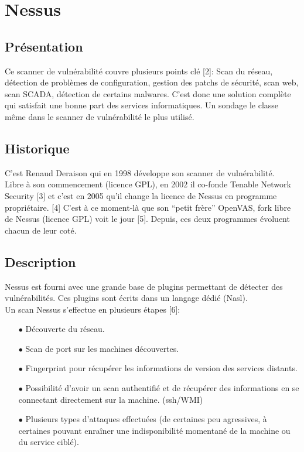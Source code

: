 \section{Nessus}
\thispagestyle{plain}
\subsection{Présentation}
Ce scanner de vulnérabilité couvre plusieurs points clé [2]: Scan du réseau, détection de problèmes de configuration, gestion des patchs de sécurité, scan web, scan SCADA, détection de certains malwares. C’est donc une solution complète qui satisfait une bonne part des services informatiques. Un sondage le classe même dans le scanner de vulnérabilité le plus utilisé.

\subsection{Historique}
C’est Renaud Deraison qui en 1998 développe son scanner de vulnérabilité.\\
Libre à son commencement (licence GPL), en 2002 il co-fonde Tenable Network Security [3] et c’est en 2005 qu’il change la licence de Nessus en programme propriétaire. [4] C’est à ce moment-là que son ``petit frère'' OpenVAS, fork libre de Nessus (licence GPL) voit le jour [5]. Depuis, ces deux programmes évoluent chacun de leur coté.

\subsection{Description}
Nessus est fourni avec une grande base de plugins permettant de détecter des vulnérabilités. Ces plugins sont écrits dans un langage dédié (Nasl).\\
Un scan Nessus s’effectue en plusieurs étapes [6]:\\
\begin{itemize}
\item [$\bullet$]Découverte du réseau.\\
\item [$\bullet$]Scan de port sur les machines découvertes.\\
\item [$\bullet$]Fingerprint pour récupérer les informations de version des services distants.\\
\item [$\bullet$]Possibilité d’avoir un scan authentifié et de récupérer des informations en se connectant directement sur la machine. (ssh/WMI)\\
\item [$\bullet$]Plusieurs types d’attaques effectuées (de certaines peu agressives, à certaines pouvant enraîner une indisponibilité momentané de la machine ou du service ciblé).\\
\end{itemize}

